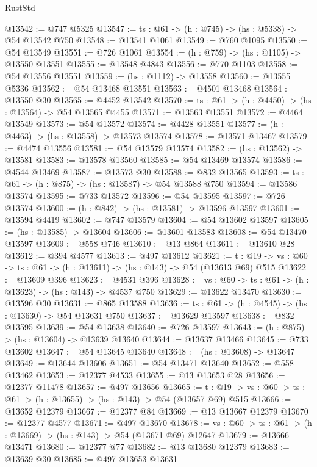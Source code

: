 \begin{lexlean}{RustStd}
\begin{coremodule}
@13542 := @747 @5325
@13547 := {ts : @61} -> (h : @745) -> (hs : @5338) -> @54 @13542 @750
@13548 := @13541 @1061
@13549 := @760 @1095
@13550 := @54 @13549
@13551 := @726 @1061
@13554 := (h : @759) -> (hs : @1105) -> @13550 @13551
@13555 := @13548 @4843
@13556 := @770 @1103
@13558 := @54 @13556 @13551
@13559 := (hs : @1112) -> @13558
@13560 := @13555 @5336
@13562 := @54 @13468 @13551
@13563 := @4501 @13468
@13564 := @13550 @30
@13565 := @4452 @13542
@13570 := {ts : @61} -> (h : @4450) -> (hs : @13564) -> @54 @13565 @4455
@13571 := @13563 @13551
@13572 := @4464 @13549
@13573 := @54 @13572
@13574 := @4428 @13551
@13577 := (h : @4463) -> (hs : @13558) -> @13573 @13574
@13578 := @13571 @13467
@13579 := @4474 @13556
@13581 := @54 @13579 @13574
@13582 := (hs : @13562) -> @13581
@13583 := @13578 @13560
@13585 := @54 @13469 @13574
@13586 := @4544 @13469
@13587 := @13573 @30
@13588 := @832 @13565
@13593 := {ts : @61} -> (h : @875) -> (hs : @13587) -> @54 @13588 @750
@13594 := @13586 @13574
@13595 := @733 @13572
@13596 := @54 @13595
@13597 := @726 @13574
@13600 := (h : @842) -> (hs : @13581) -> @13596 @13597
@13601 := @13594 @4419
@13602 := @747 @13579
@13604 := @54 @13602 @13597
@13605 := (hs : @13585) -> @13604
@13606 := @13601 @13583
@13608 := @54 @13470 @13597
@13609 := @558 @746
@13610 := @13 @864
@13611 := @13610 @28
@13612 := @394 @4577
@13613 := @497 @13612
@13621 := {t : @19} ->
  {vs : @60} -> {ts : @61} -> (h : @13611) -> (hs : @143) -> @54 (@13613 @69) @515
@13622 := @13609 @396
@13623 := @4531 @396
@13628 := {vs : @60} -> {ts : @61} -> (h : @13623) -> (hs : @143) -> @4537 @750
@13629 := @13622 @13470
@13630 := @13596 @30
@13631 := @865 @13588
@13636 := {ts : @61} -> (h : @4545) -> (hs : @13630) -> @54 @13631 @750
@13637 := @13629 @13597
@13638 := @832 @13595
@13639 := @54 @13638
@13640 := @726 @13597
@13643 := (h : @875) -> (hs : @13604) -> @13639 @13640
@13644 := @13637 @13466
@13645 := @733 @13602
@13647 := @54 @13645 @13640
@13648 := (hs : @13608) -> @13647
@13649 := @13644 @13606
@13651 := @54 @13471 @13640
@13652 := @558 @13462
@13653 := @12377 @4533
@13655 := @13 @13653 @28
@13656 := @12377 @11478
@13657 := @497 @13656
@13665 := {t : @19} ->
  {vs : @60} -> {ts : @61} -> (h : @13655) -> (hs : @143) -> @54 (@13657 @69) @515
@13666 := @13652 @12379
@13667 := @12377 @84
@13669 := @13 @13667 @12379
@13670 := @12377 @4577
@13671 := @497 @13670
@13678 := {vs : @60} -> {ts : @61} -> (h : @13669) -> (hs : @143) -> @54 (@13671 @69) @12647
@13679 := @13666 @13471
@13680 := @12377 @77
@13682 := @13 @13680 @12379
@13683 := @13639 @30
@13685 := @497 @13653 @13631

\end{coremodule}
\end{lexlean}
